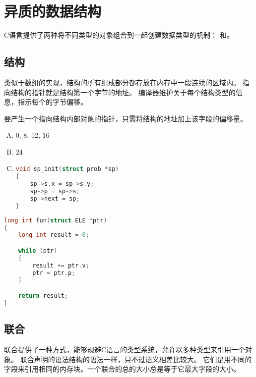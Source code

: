 
\section{异质的数据结构}
{
    C语言提供了两种将不同类型的对象组合到一起创建数据类型的机制：
    和。

    \subsection{结构}
    {
        类似于数组的实现，结构的所有组成部分都存放在内存中一段连续的区域内。
        指向结构的指针就是结构第一个字节的地址。
        编译器维护关于每个结构类型的信息，指示每个的字节偏移。

        要产生一个指向结构内部对象的指针，只需将结构的地址加上该字段的偏移量。

        \begin{practicec}
            \begin{enumerate}[A.]
                \item 0, 8, 12, 16
                \item 24
                \item
                {
                    \begin{lstlisting}[language=C]
void sp_init(struct prob *sp)
{
    sp->s.x = sp->s.y;
    sp->p = sp->s;
    sp->next = sp;
}
                    \end{lstlisting}
                }
            \end{enumerate}
        \end{practicec}

        \begin{practicec}
            \begin{lstlisting}[language=C]
long int fun(struct ELE *ptr)
{
    long int result = 0;

    while (ptr)
    {
        result += ptr.v;
        ptr = ptr.p;
    }

    return result;
}
            \end{lstlisting}
        \end{practicec}
    }

    \subsection{联合}
    {
        联合提供了一种方式，能够规避C语言的类型系统，允许以多种类型来引用一个对象。
        联合声明的语法结构的语法一样，只不过语义相差比较大。
        它们是用不同的字段来引用相同的内存块。一个联合的总的大小总是等于它最大字段的大小。

}}
